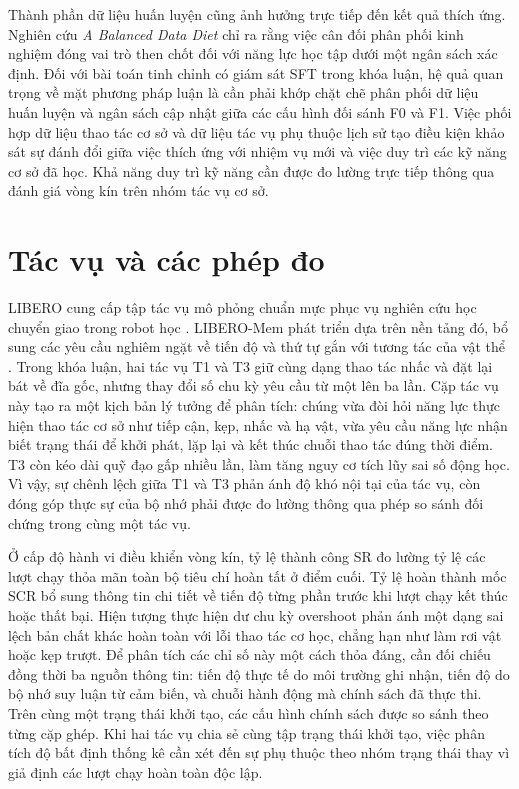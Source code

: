 Thành phần dữ liệu huấn luyện cũng ảnh hưởng trực tiếp đến kết quả thích ứng. Nghiên cứu \textit{A Balanced Data Diet} \cite{balanceddiet2026} chỉ ra rằng việc cân đối phân phối kinh nghiệm đóng vai trò then chốt đối với năng lực học tập dưới một ngân sách xác định. Đối với bài toán tinh chỉnh có giám sát SFT trong khóa luận, hệ quả quan trọng về mặt phương pháp luận là cần phải khớp chặt chẽ phân phối dữ liệu huấn luyện và ngân sách cập nhật giữa các cấu hình đối sánh F0 và F1. Việc phối hợp dữ liệu thao tác cơ sở và dữ liệu tác vụ phụ thuộc lịch sử tạo điều kiện khảo sát sự đánh đổi giữa việc thích ứng với nhiệm vụ mới và việc duy trì các kỹ năng cơ sở đã học. Khả năng duy trì kỹ năng cần được đo lường trực tiếp thông qua đánh giá vòng kín trên nhóm tác vụ cơ sở.

\section{Tác vụ và các phép đo}

LIBERO cung cấp tập tác vụ mô phỏng chuẩn mực phục vụ nghiên cứu học chuyển giao trong robot học \cite{libero2023}. LIBERO-Mem phát triển dựa trên nền tảng đó, bổ sung các yêu cầu nghiêm ngặt về tiến độ và thứ tự gắn với tương tác của vật thể \cite{liberomem2025}. Trong khóa luận, hai tác vụ T1 và T3 giữ cùng dạng thao tác nhấc và đặt lại bát về đĩa gốc, nhưng thay đổi số chu kỳ yêu cầu từ một lên ba lần. Cặp tác vụ này tạo ra một kịch bản lý tưởng để phân tích: chúng vừa đòi hỏi năng lực thực hiện thao tác cơ sở như tiếp cận, kẹp, nhấc và hạ vật, vừa yêu cầu năng lực nhận biết trạng thái để khởi phát, lặp lại và kết thúc chuỗi thao tác đúng thời điểm. T3 còn kéo dài quỹ đạo gấp nhiều lần, làm tăng nguy cơ tích lũy sai số động học. Vì vậy, sự chênh lệch giữa T1 và T3 phản ánh độ khó nội tại của tác vụ, còn đóng góp thực sự của bộ nhớ phải được đo lường thông qua phép so sánh đối chứng trong cùng một tác vụ.

Ở cấp độ hành vi điều khiển vòng kín, tỷ lệ thành công SR đo lường tỷ lệ các lượt chạy thỏa mãn toàn bộ tiêu chí hoàn tất ở điểm cuối. Tỷ lệ hoàn thành mốc SCR bổ sung thông tin chi tiết về tiến độ từng phần trước khi lượt chạy kết thúc hoặc thất bại. Hiện tượng thực hiện dư chu kỳ overshoot phản ánh một dạng sai lệch bản chất khác hoàn toàn với lỗi thao tác cơ học, chẳng hạn như làm rơi vật hoặc kẹp trượt. Để phân tích các chỉ số này một cách thỏa đáng, cần đối chiếu đồng thời ba nguồn thông tin: tiến độ thực tế do môi trường ghi nhận, tiến độ do bộ nhớ suy luận từ cảm biến, và chuỗi hành động mà chính sách đã thực thi. Trên cùng một trạng thái khởi tạo, các cấu hình chính sách được so sánh theo từng cặp ghép. Khi hai tác vụ chia sẻ cùng tập trạng thái khởi tạo, việc phân tích độ bất định thống kê cần xét đến sự phụ thuộc theo nhóm trạng thái thay vì giả định các lượt chạy hoàn toàn độc lập.

